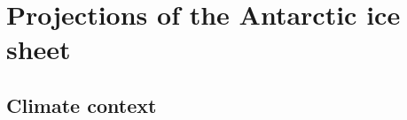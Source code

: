 


\section{Projections of the Antarctic ice sheet}
\subsection{Climate context}\label{section:climate-context}

